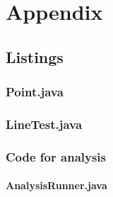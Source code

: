 \chapter{Appendix}

\section{Listings}

\subsection{Point.java}


\newpage

\subsection{LineTest.java}


\subsection{Code for analysis}

\subsubsection{AnalysisRunner.java}
